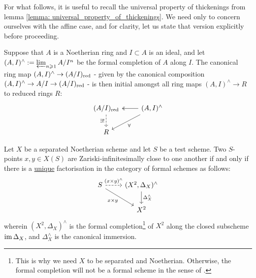         For what follows, it is useful to recall the universal property of thickenings from lemma \ref{lemma: universal_property_of_thickenings}. We need only to concern ourselves with the affine case, and for clarity, let us state that version explicitly before proceeding.
        \begin{lemma} \label{lemma: universal_property_of_thickenings_affine_case}
            Suppose that $A$ is a Noetherian ring and $I \subset A$ is an ideal, and let $(A, I)^{\wedge} := \projlim_{n \geq 1} A/I^n$ be the formal completion of $A$ along $I$. The canonical ring map $(A, I)^{\wedge} \to (A/I)_{\red}$ - given by the canonical composition $(A, I)^{\wedge} \to A/I \to (A/I)_{\red}$ - is then initial amongst all ring maps $(A, I)^{\wedge} \to R$ to reduced rings $R$:
                $$
                    \begin{tikzcd}
                	{(A/I)_{\red}} & {(A, I)^{\wedge}} \\
                	R
                	\arrow["{\exists!}"', dashed, from=1-1, to=2-1]
                	\arrow[two heads, from=1-2, to=1-1]
                	\arrow["\forall", from=1-2, to=2-1]
                    \end{tikzcd}
                $$
        \end{lemma}
        \begin{proposition} \label{prop: infinitesimality_and_the_diagonal}
            Let $X$ be a separated Noetherian scheme and let $S$ be a test scheme. Two $S$-points $x, y \in X(S)$ are Zariski-infinitesimally close to one another if and only if there is a \underline{unique} factorisation in the category of formal schemes as follows:
                $$
                    \begin{tikzcd}
                        S & {(X^2, \Delta_X)^{\wedge}} \\
                        & {X^2}
                        \arrow["(x \x y)^{\wedge}", dashed, from=1-1, to=1-2]
                        \arrow["{x \x y}"', from=1-1, to=2-2]
                        \arrow["{\Delta_X^{\wedge}}", from=1-2, to=2-2]
                    \end{tikzcd}
                $$
            wherein $(X^2, \Delta_X)^{\wedge}$ is the formal completion\footnote{This is why we need $X$ to be separated and Noetherian. Otherwise, the formal completion will not be a formal scheme in the sense of \cite{hartshorne}.} of $X^2$ along the closed subscheme $\im \Delta_X$, and $\Delta_X^{\wedge}$ is the canonical immersion. 
        \end{proposition}
